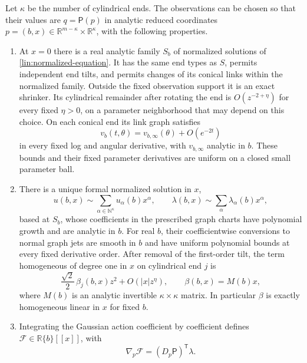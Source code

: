 \begin{proposition}\label{lin:family}
Let $\kappa$ be the number of cylindrical ends.  The observations can
be chosen so that their values are $q=\mathsf P(p)$ in analytic reduced
coordinates $p=(b,x)\in\mathbb R^{m-\kappa}\times\mathbb R^\kappa$,
with the following properties.
\begin{enumerate}
 \item At $x=0$ there is a real analytic family $S_b$ of normalized
 solutions of \eqref{lin:normalized-equation}.  It has the same end
 types as $S$, permits independent end tilts, and permits changes of
 its conical links within the normalized family.
 Outside the fixed observation support it is an exact shrinker.
 Its cylindrical remainder after rotating the end is
 $O(z^{-2+\eta})$ for every fixed $\eta>0$, on a parameter neighborhood
 that may depend on this choice.  On each conical end its link
 graph satisfies
 \begin{equation}\label{lin:family-conical-asymptotics}
 v_b(t,\theta)=v_{b,\infty}(\theta)+O(e^{-2t})
 \end{equation}
 in every fixed log and angular derivative, with $v_{b,\infty}$ analytic
 in $b$.  These bounds and their fixed parameter derivatives are uniform
 on a closed small parameter ball.
 \item There is a unique formal normalized solution in $x$,
 \[
 u(b,x)\sim\sum_{\alpha\in\mathbb N^\kappa}u_\alpha(b)x^\alpha,
 \qquad\lambda(b,x)\sim\sum_\alpha\lambda_\alpha(b)x^\alpha,
 \]
 based at $S_b$, whose coefficients in the prescribed graph charts
 have polynomial growth and are analytic in $b$.  For real $b$, their
 coefficientwise conversions to normal graph jets are smooth in $b$ and
 have uniform polynomial bounds at every fixed derivative order.
 After removal of the first-order tilt, the term homogeneous of degree
 one in $x$ on cylindrical end $j$ is
 \begin{equation}\label{lin:opening-coefficient}
  \frac{\sqrt2}{2}\,\beta_j(b,x)z^2+O(|x|z^\eta),
  \qquad \beta(b,x)=M(b)x,
 \end{equation}
 where $M(b)$ is an analytic invertible $\kappa\times\kappa$ matrix.
 In particular $\beta$ is exactly homogeneous linear in $x$ for fixed
 $b$.
 \item Integrating the Gaussian action coefficient by coefficient
 defines $\mathcal F\in\mathbb R\{b\}[[x]]$, with
 \begin{equation}\label{lin:action-multipliers}
  \nabla_p\mathcal F=(D_p\mathsf P)^{\mathsf T}\lambda.

\end{equation}
\end{enumerate}
\end{proposition}

